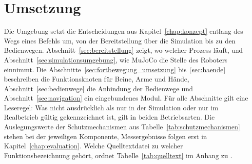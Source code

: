 \chapter{Umsetzung}
\label{chap:umsetzung}


Die Umgebung setzt die Entscheidungen aus Kapitel~\ref{chap:konzept} entlang des Wegs eines Befehls um, von der Bereitstellung über die Simulation bis zu den Bedienwegen.
Abschnitt~\ref{sec:bereitstellung} zeigt, wo welcher Prozess läuft, und Abschnitt~\ref{sec:simulationsumgebung}, wie MuJoCo die Stelle des Roboters einnimmt.
Die Abschnitte~\ref{sec:fortbewegung_umsetzung} bis~\ref{sec:haende} beschreiben die Funktionsknoten für Beine, Arme und Hände, Abschnitt~\ref{sec:bedienwege} die Anbindung der Bedienwege und Abschnitt~\ref{sec:navigation} ein eingebundenes Modul.
Für alle Abschnitte gilt eine Leseregel: Was nicht ausdrücklich als nur in der Simulation oder nur im Realbetrieb gültig gekennzeichnet ist, gilt in beiden Betriebsarten.
Die Auslegungswerte der Schutzmechanismen aus Tabelle~\ref{tab:schutzmechanismen} stehen bei der jeweiligen Komponente, Messergebnisse folgen erst in Kapitel~\ref{chap:evaluation}.
Welche Quelltextdatei zu welcher Funktionsbezeichnung gehört, ordnet Tabelle~\ref{tab:quelltext} im Anhang zu .

